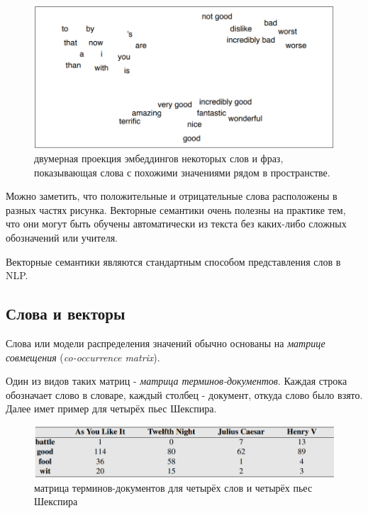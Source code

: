 \documentclass[a4paper,12pt,preview]{report} %
\begin{document}
	
	\begin{figure}[H]
		\centering\includegraphics[scale=0.6]{sema.PNG}
		\caption{ двумерная проекция эмбеддингов некоторых слов и фраз, показывающая слова с похожими значениями рядом в пространстве.}
		\label{fig:sema}
	\end{figure}
	
	Можно заметить, что положительные и отрицательные слова расположены в разных частях рисунка.
	Векторные семантики очень полезны на практике тем, что они могут быть обучены автоматически из текста без каких-либо сложных обозначений или учителя.
	
	Векторные семантики являются стандартным способом представления слов в NLP.
	
	
	\subsection{Слова и векторы}
	
	Слова или модели распределения значений обычно основаны на \textit{матрице совмещения} (\textit{co-occurrence matrix}).
	
	Один из видов таких матриц - \textit{матрица терминов-документов}. Каждая строка обозначает слово в словаре, каждый столбец - документ, откуда слово было взято. Далее имет пример для четырёх пьес Шекспира.
	
	
	\begin{figure}[H]
		\centering\includegraphics[scale=0.6]{shake.PNG}
		\caption{матрица терминов-документов для четырёх слов и четырёх пьес Шекспира}
		\label{fig:shake}
	\end{figure}
	
\end{document}
